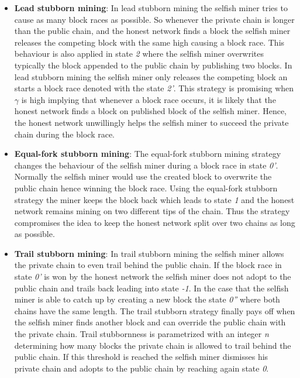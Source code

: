 \begin{itemize}
	\item \textbf{Lead stubborn mining}:
	In lead stubborn mining the selfish miner tries to cause as many block races as possible.
	So whenever the private chain is longer than the public chain, and the honest network finds a block the selfish miner releases the competing block with the same high causing a block race.
	This behaviour is also applied in state \textit{2} where the selfish miner overwrites typically the block appended to the public chain by publishing two blocks.
	In lead stubborn mining the selfish miner only releases the competing block an starts a block race denoted with the state \textit{2'}.
	This strategy is promising when $\gamma$ is high implying that whenever a block race occurs, it is likely that the honest network finds a block on published block of the selfish miner. 
	Hence, the honest network unwillingly helps the selfish miner to succeed the private chain during the block race.
	\item \textbf{Equal-fork stubborn mining}:
	The equal-fork stubborn mining strategy changes the behaviour of the selfish miner during a block race in state \textit{0'}.
	Normally the selfish miner would use the created block to overwrite the public chain hence winning the block race.
	Using the equal-fork stubborn strategy the miner keeps the block back which leads to state \textit{1} and the honest network remains mining on two different tips of the chain.
	Thus the strategy compromises the idea to keep the honest network split over two chains as long as possible.
	\item \textbf{Trail stubborn mining}:
	In trail stubborn mining the selfish miner allows the private chain to even trail behind the public chain.
	If the block race in state \textit{0'} is won by the honest network the selfish miner does not adopt to the public chain and trails back leading into state \textit{-1}.
	In the case that the selfish miner is able to catch up by creating a new block the state \textit{0''} where both chains have the same length.
	The trail stubborn strategy finally pays off when the selfish miner finds another block and can override the public chain with the private chain.
	Trail stubbornness is parametrized with an integer \textit{n} determining how many blocks the private chain is allowed to trail behind the public chain.
	If this threshold is reached the selfish miner dismisses his private chain and adopts to the public chain by reaching again state \textit{0}.
\end{itemize}


